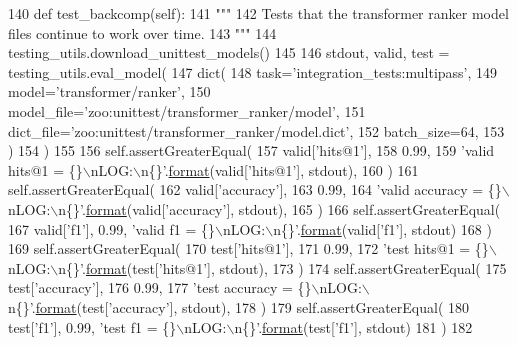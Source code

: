 \begin{DoxyCode}
140     \textcolor{keyword}{def }test\_backcomp(self):
141         \textcolor{stringliteral}{"""}
142 \textcolor{stringliteral}{        Tests that the transformer ranker model files continue to work over time.}
143 \textcolor{stringliteral}{        """}
144         testing\_utils.download\_unittest\_models()
145 
146         stdout, valid, test = testing\_utils.eval\_model(
147             dict(
148                 task=\textcolor{stringliteral}{'integration\_tests:multipass'},
149                 model=\textcolor{stringliteral}{'transformer/ranker'},
150                 model\_file=\textcolor{stringliteral}{'zoo:unittest/transformer\_ranker/model'},
151                 dict\_file=\textcolor{stringliteral}{'zoo:unittest/transformer\_ranker/model.dict'},
152                 batch\_size=64,
153             )
154         )
155 
156         self.assertGreaterEqual(
157             valid[\textcolor{stringliteral}{'hits@1'}],
158             0.99,
159             \textcolor{stringliteral}{'valid hits@1 = \{\}\(\backslash\)nLOG:\(\backslash\)n\{\}'}.\hyperlink{namespaceparlai_1_1chat__service_1_1services_1_1messenger_1_1shared__utils_a32e2e2022b824fbaf80c747160b52a76}{format}(valid[\textcolor{stringliteral}{'hits@1'}], stdout),
160         )
161         self.assertGreaterEqual(
162             valid[\textcolor{stringliteral}{'accuracy'}],
163             0.99,
164             \textcolor{stringliteral}{'valid accuracy = \{\}\(\backslash\)nLOG:\(\backslash\)n\{\}'}.\hyperlink{namespaceparlai_1_1chat__service_1_1services_1_1messenger_1_1shared__utils_a32e2e2022b824fbaf80c747160b52a76}{format}(valid[\textcolor{stringliteral}{'accuracy'}], stdout),
165         )
166         self.assertGreaterEqual(
167             valid[\textcolor{stringliteral}{'f1'}], 0.99, \textcolor{stringliteral}{'valid f1 = \{\}\(\backslash\)nLOG:\(\backslash\)n\{\}'}.\hyperlink{namespaceparlai_1_1chat__service_1_1services_1_1messenger_1_1shared__utils_a32e2e2022b824fbaf80c747160b52a76}{format}(valid[\textcolor{stringliteral}{'f1'}], stdout)
168         )
169         self.assertGreaterEqual(
170             test[\textcolor{stringliteral}{'hits@1'}],
171             0.99,
172             \textcolor{stringliteral}{'test hits@1 = \{\}\(\backslash\)nLOG:\(\backslash\)n\{\}'}.\hyperlink{namespaceparlai_1_1chat__service_1_1services_1_1messenger_1_1shared__utils_a32e2e2022b824fbaf80c747160b52a76}{format}(test[\textcolor{stringliteral}{'hits@1'}], stdout),
173         )
174         self.assertGreaterEqual(
175             test[\textcolor{stringliteral}{'accuracy'}],
176             0.99,
177             \textcolor{stringliteral}{'test accuracy = \{\}\(\backslash\)nLOG:\(\backslash\)n\{\}'}.\hyperlink{namespaceparlai_1_1chat__service_1_1services_1_1messenger_1_1shared__utils_a32e2e2022b824fbaf80c747160b52a76}{format}(test[\textcolor{stringliteral}{'accuracy'}], stdout),
178         )
179         self.assertGreaterEqual(
180             test[\textcolor{stringliteral}{'f1'}], 0.99, \textcolor{stringliteral}{'test f1 = \{\}\(\backslash\)nLOG:\(\backslash\)n\{\}'}.\hyperlink{namespaceparlai_1_1chat__service_1_1services_1_1messenger_1_1shared__utils_a32e2e2022b824fbaf80c747160b52a76}{format}(test[\textcolor{stringliteral}{'f1'}], stdout)
181         )
182 
\end{DoxyCode}
